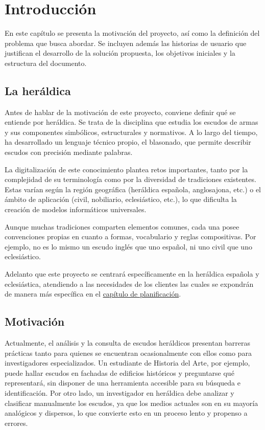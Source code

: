 \chapter{Introducción}

En este capítulo se presenta la motivación del proyecto, así como la definición
del problema que busca abordar. Se incluyen además las historias de usuario que
justifican el desarrollo de la solución propuesta, los objetivos iniciales y la
estructura del documento.

\section{La heráldica} \label{sec:heraldica}

Antes de hablar de la motivación de este proyecto, conviene definir qué se entiende 
por heráldica. Se trata de la disciplina que estudia los escudos de armas y sus componentes 
simbólicos, estructurales y normativos. A lo largo del tiempo, ha desarrollado un lenguaje 
técnico propio, el blasonado, que permite describir escudos con precisión mediante palabras.  

La digitalización de este conocimiento plantea retos importantes, tanto por la 
complejidad de su terminología como por la diversidad de tradiciones existentes. Estas varían 
según la región geográfica (heráldica española, anglosajona, etc.) o el ámbito de aplicación 
(civil, nobiliario, eclesiástico, etc.), lo que dificulta la creación de modelos informáticos 
universales.

Aunque muchas tradiciones comparten elementos comunes, cada una posee convenciones propias en 
cuanto a formas, vocabulario y reglas compositivas. Por ejemplo, no es lo mismo un escudo inglés
que uno español, ni uno civil que uno eclesiástico. 

Adelanto que este proyecto se centrará específicamente en la heráldica española y eclesiástica, 
atendiendo a las necesidades de los clientes las cuales se expondrán de manera más específica en 
el \hyperref[sec:historias_usuario]{capítulo de planificación}.

\section{Motivación}
Actualmente, el análisis y la consulta de escudos heráldicos presentan barreras
prácticas tanto para quienes se encuentran ocasionalmente con ellos como para 
investigadores especializados. Un estudiante de Historia del Arte, por ejemplo, 
puede hallar escudos en fachadas de edificios históricos y preguntarse qué representará,
sin disponer de una herramienta accesible para su búsqueda e identificación. 
Por otro lado,  un investigador en heráldica debe analizar y clasificar manualmente
los escudos, ya que los medios actuales son en su mayoría analógicos y dispersos, lo 
que convierte esto en un proceso lento y propenso a errores.


